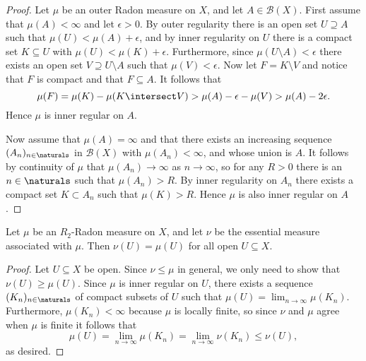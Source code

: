 \documentclass[article, a4paper, 11pt, oneside]{memoir}
\numberwithin{equation}{chapter}
\newcommand{\calB}{\mathcal{B}}
\newcommand{\borel}[1]{\calB(#1)}
\begin{document}
\begin{proof}
    Let $\mu$ be an outer Radon measure on $X$, and let $A \in \borel{X}$. First assume that $\mu(A) < \infty$ and let $\epsilon > 0$. By outer regularity there is an open set $U \supseteq A$ such that $\mu(U) < \mu(A) + \epsilon$, and by inner regularity on $U$ there is a compact set $K \subseteq U$ with $\mu(U) < \mu(K) + \epsilon$. Furthermore, since $\mu(U \setminus A) < \epsilon$ there exists an open set $V \supseteq U \setminus A$ such that $\mu(V) < \epsilon$. Now let $F = K \setminus V$ and notice that $F$ is compact and that $F \subseteq A$. It follows that
    \begin{equation*}
        \mu(F)
            = \mu(K) - \mu(K \intersect V)
            > \mu(A) - \epsilon - \mu(V)
            > \mu(A) - 2\epsilon.
    \end{equation*}
    Hence $\mu$ is inner regular on $A$.

    Now assume that $\mu(A) = \infty$ and that there exists an increasing sequence $(A_n)_{n \in \naturals}$ in $\borel{X}$ with $\mu(A_n) < \infty$, and whose union is $A$. It follows by continuity of $\mu$ that $\mu(A_n) \to \infty$ as $n \to \infty$, so for any $R > 0$ there is an $n \in \naturals$ such that $\mu(A_n) > R$. By inner regularity on $A_n$ there exists a compact set $K \subset A_n$ such that $\mu(K) > R$. Hence $\mu$ is also inner regular on $A$.
\end{proof}

\begin{lemma}
    \label{thm:Radon-agree-on-open-sets}
    Let $\mu$ be an $R_2$-Radon measure on $X$, and let $\nu$ be the essential measure associated with $\mu$. Then $\nu(U) = \mu(U)$ for all open $U \subseteq X$.
\end{lemma}

\begin{proof}
    Let $U \subseteq X$ be open. Since $\nu \leq \mu$ in general, we only need to show that $\nu(U) \geq \mu(U)$. Since $\mu$ is inner regular on $U$, there exists a sequence $(K_n)_{n \in \naturals}$ of compact subsets of $U$ such that $\mu(U) = \lim_{n \to \infty} \mu(K_n)$. Furthermore, $\mu(K_n) < \infty$ because $\mu$ is locally finite, so since $\nu$ and $\mu$ agree when $\mu$ is finite it follows that
    \begin{equation*}
        \mu(U)
            = \lim_{n \to \infty} \mu(K_n)
            = \lim_{n \to \infty} \nu(K_n)
            \leq \nu(U),
    \end{equation*}
    as desired.
\end{proof}
\end{document}
